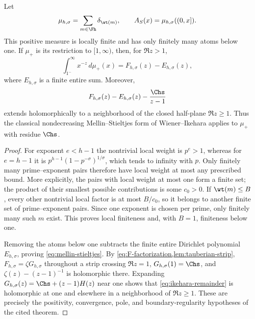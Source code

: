\begin{lemma}
\label{lem:wiener-ikehara-check}
Let
\begin{equation}
  \mu_{h,\sigma}=\sum_{m\in\Fh}\delta_{\wt(m)},
  \qquad
  A_S(x)=\mu_{h,\sigma}((0,x]).
  \label{eq:counting-measure}
\end{equation}
This positive measure is locally finite and has only finitely many atoms
below one.  If $\mu_+$ is its restriction to $[1,\infty)$, then, for
$\Re z>1$,
\begin{equation}
  \int_{1^-}^{\infty}x^{-z}\,d\mu_+(x)
    =F_{h,\sigma}(z)-E_{h,\sigma}(z),
  \label{eq:mellin-stieltjes}
\end{equation}
where $E_{h,\sigma}$ is a finite entire sum.  Moreover,
\begin{equation}
  F_{h,\sigma}(z)-E_{h,\sigma}(z)
    -\frac{\Chs}{z-1}
  \label{eq:ikehara-remainder}
\end{equation}
extends holomorphically to a neighborhood of the closed half-plane
$\Re z\ge1$.  Thus the classical nondecreasing Mellin--Stieltjes form of
Wiener--Ikehara \cite[Ch.~III, Sec.~4, pp.~124--127]{Korevaar2004}
applies to $\mu_+$ with residue $\Chs$.
\end{lemma}

\begin{proof}
For exponent $e<h-1$ the nontrivial local weight is $p^e>1$, whereas for
$e=h-1$ it is
$p^{h-1}(1-p^{-\sigma})^{1/\sigma}$, which tends to infinity with $p$.
Only finitely many prime--exponent pairs therefore have local weight at
most any prescribed bound.  More explicitly, the pairs with local weight
at most one form a finite set; the product of their smallest possible
contributions is some $c_0>0$.  If $\wt(m)\le B$, every other nontrivial
local factor is at most $B/c_0$, so it belongs to another finite set of
prime--exponent pairs.  Since one exponent is chosen per prime, only
finitely many such $m$ exist.  This proves local finiteness and, with
$B=1$, finiteness below one.

Removing the atoms below one subtracts the finite entire Dirichlet
polynomial $E_{h,\sigma}$, proving \cref{eq:mellin-stieltjes}.  By
\cref{eq:F-factorization,lem:tauberian-strip},
$F_{h,\sigma}=\zeta G_{h,\sigma}$ throughout a strip crossing
$\Re z=1$, $G_{h,\sigma}(1)=\Chs$, and
$\zeta(z)-(z-1)^{-1}$ is holomorphic there.  Expanding
$G_{h,\sigma}(z)=\Chs+(z-1)H(z)$ near one shows that
\cref{eq:ikehara-remainder} is holomorphic at one and elsewhere in a
neighborhood of $\Re z\ge1$.  These are precisely the positivity,
convergence, pole, and boundary-regularity hypotheses of the cited theorem.
\end{proof}

